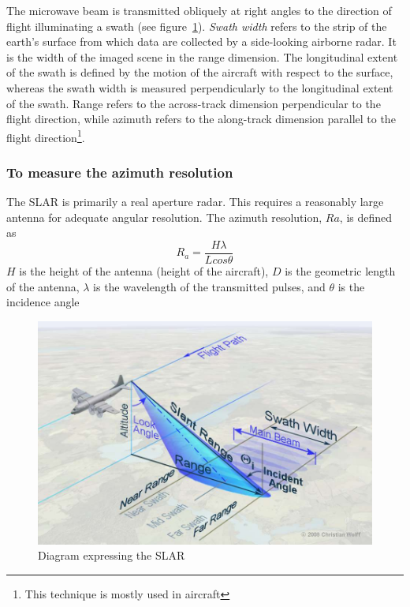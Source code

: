 The microwave beam is transmitted obliquely at right angles to the direction of flight illuminating a swath (see figure~\ref{fig:slar2}). \textit{Swath width} refers to the strip of the earth's surface from which data are collected by a side-looking airborne radar. It is the width of the imaged scene in the range dimension. The longitudinal extent of the swath is defined by the motion of the aircraft with respect to the surface, whereas the swath width is measured perpendicularly to the longitudinal extent of the swath. Range refers to the across-track dimension perpendicular to the flight direction, while azimuth refers to the along-track dimension parallel to the flight direction\footnote{This technique is mostly used in aircraft}.

\subsubsection*{To measure the azimuth resolution}
The SLAR is primarily a real aperture radar. This requires a reasonably large antenna for adequate angular resolution. The azimuth resolution, $ Ra $, is defined as
\begin{dmath}
R_{a}=\frac{H \lambda}{L cos\theta}
\end{dmath}
$ H $ is the height of the antenna (height of the aircraft), $ D $ is the geometric length of the antenna, $\lambda$ is the wavelength of the transmitted pulses, and $\theta$ is the incidence angle
\begin{figure}[h]
\centering
\includegraphics[scale=0.2]{./graphics/SLAR2}
\caption{Diagram expressing the SLAR}
\label{fig:slar2}
\end{figure}


